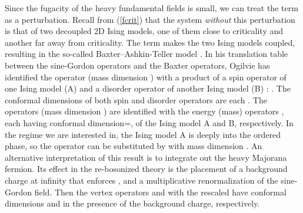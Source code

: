 \documentclass[a4paper,aps,prd,superscriptaddress,showpacs,showkeys]{revtex4}
\begin{document}
Since the fugacity \coordHE{} of the heavy fundamental fields is small, we can
treat the term \coordHE{}
as a perturbation. Recall
from  (\ref{fcrit}) that the system {\it without} this perturbation is
that of two decoupled 2D Ising models,
one of them close to criticality and another far away from criticality.
The term \coordHE{} makes the two Ising models
coupled, resulting in the so-called Baxter--Ashkin-Teller model
\cite{ogilvie}. In his translation table between the sine-Gordon operators
and the Baxter operators,
Ogilvie \cite{ogilvie} has identified the operator \coordHE{}
(mass dimension \coordHE{})
with a product of a spin operator of one Ising model (A) and a disorder
operator
of another Ising model (B) : \coordHE{}.
The conformal dimensions of both spin and disorder operators are each
\coordHE{}.
The operators \coordHE{} (mass
dimension \coordHE{})
are identified with the energy (mass) operators
\coordHE{}, each having conformal
dimension=\coordHE{}, of  the Ising model A and B, respectively.
In the regime we are interested in, the Ising model A is deeply into the
ordered phase, so
the operator \coordHE{} can be substituted by
\coordHE{} with mass dimension \coordHE{}.
An alternative interpretation of this result is to integrate out the heavy
Majorana fermion. Its effect in the re-bosonized theory is
the placement of a background charge at infinity that enforces
\coordHE{},
and a multiplicative renormalization of the sine-Gordon field.
Then the vertex operators \coordHE{} and \coordHE{}
with the rescaled \myHighlight{$\tilde{\chi}$}\coordHE{} have
conformal dimensions \coordHE{} and \coordHE{} in the presence
of the background charge, respectively.
\end{document}
